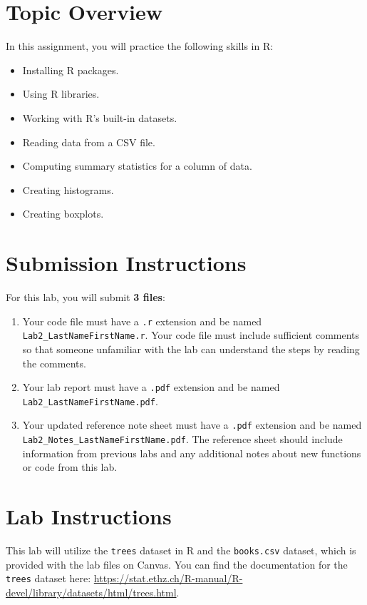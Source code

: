 \documentclass{article}
\begin{document}
\section*{Topic Overview}
In this assignment, you will practice the following skills in R:
\begin{itemize}
    \item Installing R packages.
    \item Using R libraries.
    \item Working with R's built-in datasets.
    \item Reading data from a CSV file.
    \item Computing summary statistics for a column of data.
    \item Creating histograms.
    \item Creating boxplots.
\end{itemize}

\section*{Submission Instructions}
For this lab, you will submit \textbf{3 files}:
\begin{enumerate}
    \item Your code file must have a \texttt{.r} extension and be named \texttt{Lab2\_LastNameFirstName.r}. Your code file must include sufficient comments so that someone unfamiliar with the lab can understand the steps by reading the comments.
    \item Your lab report must have a \texttt{.pdf} extension and be named \texttt{Lab2\_LastNameFirstName.pdf}.
    \item Your updated reference note sheet must have a \texttt{.pdf} extension and be named \\\texttt{Lab2\_Notes\_LastNameFirstName.pdf}. The reference sheet should include information from previous labs and any additional notes about new functions or code from this lab.
\end{enumerate}
\section*{Lab Instructions}
This lab will utilize the \texttt{trees} dataset in R and the \texttt{books.csv} dataset, which is provided with the lab files on Canvas. You can find the documentation for the \texttt{trees} dataset here: 
\href{https://stat.ethz.ch/R-manual/R-devel/library/datasets/html/trees.html}{https://stat.ethz.ch/R-manual/R-devel/library/datasets/html/trees.html}.
\end{document}
